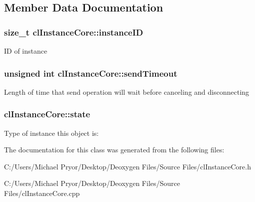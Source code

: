 \subsection{Member Data Documentation}
\hypertarget{classcl_instance_core_ad3de74dbad74098dc2f010806186bf7f}{
\subsubsection[{instanceID}]{\setlength{\rightskip}{0pt plus 5cm}size\_\-t {\bf clInstanceCore::instanceID}}}
\label{classcl_instance_core_ad3de74dbad74098dc2f010806186bf7f}
ID of instance \hypertarget{classcl_instance_core_a05be31d3ac12930f23fb1a06c25b225c}{
\subsubsection[{sendTimeout}]{\setlength{\rightskip}{0pt plus 5cm}unsigned int {\bf clInstanceCore::sendTimeout}}}
\label{classcl_instance_core_a05be31d3ac12930f23fb1a06c25b225c}
Length of time that send operation will wait before canceling and disconnecting \hypertarget{classcl_instance_core_a09705e1a816f5720469b7931d7d7fc0d}{
\subsubsection[{state}]{ {\bf clInstanceCore::state}}}
\label{classcl_instance_core_a09705e1a816f5720469b7931d7d7fc0d}
Type of instance this object is: 

The documentation for this class was generated from the following files:\begin{DoxyCompactItemize}
\item 
C:/Users/Michael Pryor/Desktop/Deoxygen Files/Source Files/clInstanceCore.h\item 
C:/Users/Michael Pryor/Desktop/Deoxygen Files/Source Files/clInstanceCore.cpp\end{DoxyCompactItemize}
